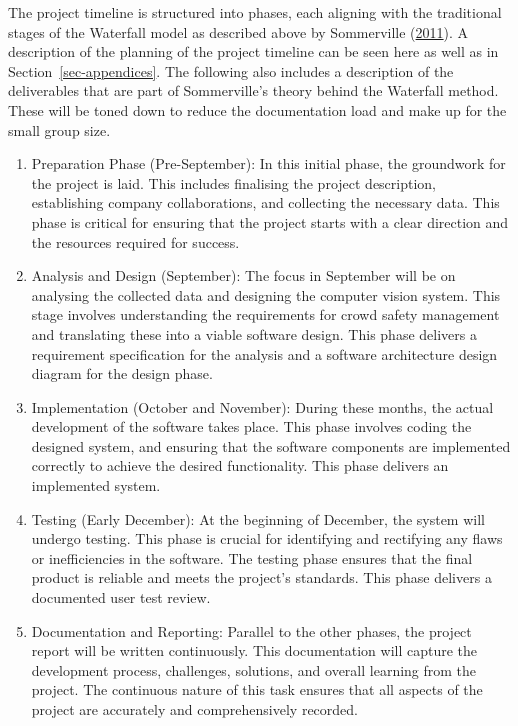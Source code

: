\documentclass[
]{article}
\begin{document}
The project timeline is structured into phases, each aligning with the
traditional stages of the Waterfall model as described above by
Sommerville (\protect\hyperlink{ref-sommerville2011software}{2011}). A
description of the planning of the project timeline can be seen here as
well as in Section~\ref{sec-appendices}. The following also includes a
description of the deliverables that are part of Sommerville's theory
behind the Waterfall method. These will be toned down to reduce the
documentation load and make up for the small group size.

\begin{enumerate}
\def\labelenumi{\arabic{enumi}.}
\item
  Preparation Phase (Pre-September): In this initial phase, the
  groundwork for the project is laid. This includes finalising the
  project description, establishing company collaborations, and
  collecting the necessary data. This phase is critical for ensuring
  that the project starts with a clear direction and the resources
  required for success.
\item
  Analysis and Design (September): The focus in September will be on
  analysing the collected data and designing the computer vision system.
  This stage involves understanding the requirements for crowd safety
  management and translating these into a viable software design. This
  phase delivers a requirement specification for the analysis and a
  software architecture design diagram for the design phase.
\item
  Implementation (October and November): During these months, the actual
  development of the software takes place. This phase involves coding
  the designed system, and ensuring that the software components are
  implemented correctly to achieve the desired functionality. This phase
  delivers an implemented system.
\item
  Testing (Early December): At the beginning of December, the system
  will undergo testing. This phase is crucial for identifying and
  rectifying any flaws or inefficiencies in the software. The testing
  phase ensures that the final product is reliable and meets the
  project's standards. This phase delivers a documented user test
  review.
\item
  Documentation and Reporting: Parallel to the other phases, the project
  report will be written continuously. This documentation will capture
  the development process, challenges, solutions, and overall learning
  from the project. The continuous nature of this task ensures that all
  aspects of the project are accurately and comprehensively recorded.
\end{enumerate}
\end{document}

